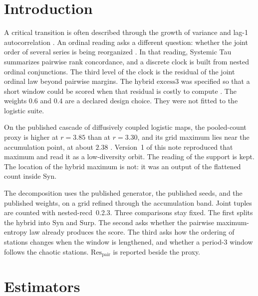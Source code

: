 \documentclass[11pt,a4paper]{article}
\newcommand{\excess}{\mathrm{excess3}}
\newcommand{\Respair}{\mathrm{Res}_{\mathrm{pair}}}
\begin{document}
\section{Introduction}
\label{sec:intro}

A critical transition is often described through the growth of variance
and lag-1 autocorrelation \citep{Scheffer2009}. An ordinal reading asks a
different question: whether the joint order of several series is being
reorganized \citep{BandtPompe2002,Padilla2026framework}. In that reading,
Systemic Tau summarizes pairwise rank concordance, and a discrete clock is
built from nested ordinal conjunctions. The third level of the clock is
the residual of the joint ordinal law beyond pairwise margins. The hybrid
$\excess$ was specified so that a short window could be scored when that
residual is costly to compute \citep{Padilla2026excess3,Padilla2026nested}.
The weights $0.6$ and $0.4$ are a declared design choice. They were not
fitted to the logistic suite.

On the published cascade of diffusively coupled logistic maps,
the pooled-count proxy is higher at $r=3.85$ than at $r=3.30$, and its
grid maximum lies near the accumulation point, at about $2.38$
\citep{Padilla2026framework}. Version~1 of this note reproduced that
maximum and read it as a low-diversity orbit. The reading of the support
is kept. The location of the hybrid maximum is not: it was an output of
the flattened count inside $\mathrm{Syn}$.

The decomposition uses the published generator, the published seeds, and
the published weights, on a grid refined through the accumulation band.
Joint tuples are counted with nested-recd~0.2.3. Three comparisons stay
fixed. The first splits the hybrid into $\mathrm{Syn}$ and
$\mathrm{Surp}$. The second asks whether the pairwise maximum-entropy law
already produces the score. The third asks how the ordering of stations
changes when the window is lengthened, and whether a period-3 window
follows the chaotic stations. $\Respair$ is reported beside the proxy.

\section{Estimators}
\label{sec:estimators}
\end{document}
